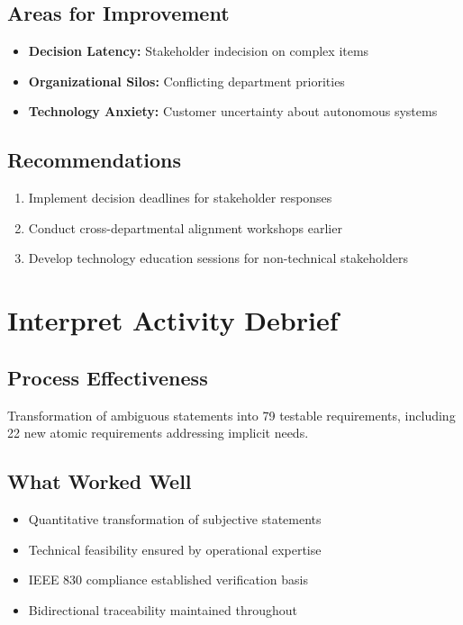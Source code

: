 \documentclass[12pt,a4paper]{article}
\begin{document}
\subsection{Areas for Improvement}
\begin{itemize}
    \item \textbf{Decision Latency:} Stakeholder indecision on complex items
    \item \textbf{Organizational Silos:} Conflicting department priorities
    \item \textbf{Technology Anxiety:} Customer uncertainty about autonomous systems
\end{itemize}

\subsection{Recommendations}
\begin{enumerate}
    \item Implement decision deadlines for stakeholder responses
    \item Conduct cross-departmental alignment workshops earlier
    \item Develop technology education sessions for non-technical stakeholders
\end{enumerate}

\section{Interpret Activity Debrief}

\subsection{Process Effectiveness}
Transformation of ambiguous statements into 79 testable requirements, including 22 new atomic requirements addressing implicit needs.

\subsection{What Worked Well}
\begin{itemize}
    \item Quantitative transformation of subjective statements
    \item Technical feasibility ensured by operational expertise
    \item IEEE 830 compliance established verification basis
    \item Bidirectional traceability maintained throughout
\end{itemize}
\end{document}
